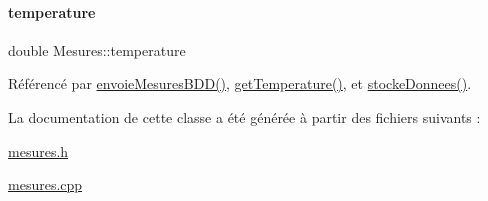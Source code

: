 \paragraph{\texorpdfstring{temperature}{temperature}}
{\footnotesize\ttfamily double Mesures\+::temperature\hspace{0.3cm}{\ttfamily [private]}}



Référencé par \hyperlink{class_mesures_a9eb8d49c9f60b3801110a5c3d0c50149}{envoie\+Mesures\+B\+D\+D()}, \hyperlink{class_mesures_a5e5e61c6bbdd2fd891b66ee494183dcd}{get\+Temperature()}, et \hyperlink{class_mesures_a77652c2332a9234bf08b463d1d389aa5}{stocke\+Donnees()}.



La documentation de cette classe a été générée à partir des fichiers suivants \+:\begin{DoxyCompactItemize}
\item 
\hyperlink{mesures_8h}{mesures.\+h}\item 
\hyperlink{mesures_8cpp}{mesures.\+cpp}\end{DoxyCompactItemize}
